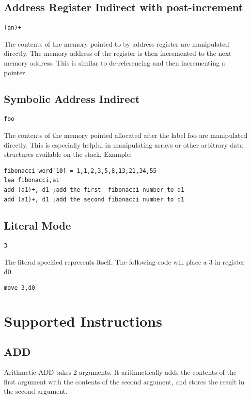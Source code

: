 \documentclass[10pt,fullpage]{article}
\begin{document}
\subsection*{Address Register Indirect with post-increment}
\begin{verbatim}(an)+\end{verbatim}
The contents of the memory pointed to by address register are
manipulated directly. The memory address of the register is then
incremented to the next memory address. This is similar to
de-referencing and then incrementing a pointer.

\subsection*{Symbolic Address Indirect}
\begin{verbatim}foo\end{verbatim}
The contents of the memory pointed allocated after the label foo are
manipulated directly. This is especially helpful in manipulating
arrays or other arbitrary data structures available on the stack.
Example:
\begin{verbatim}
fibonacci word[10] = 1,1,2,3,5,8,13,21,34,55
lea fibonacci,a1
add (a1)+, d1 ;add the first  fibonacci number to d1
add (a1)+, d1 ;add the second fibonacci number to d1
\end{verbatim}

\subsection*{Literal Mode}
\begin{verbatim}3\end{verbatim}
The literal specified represents itself. The following code will
place a 3 in register d0.
\begin{verbatim}move 3,d0\end{verbatim}


\section*{Supported Instructions}

\subsection*{ADD}
Arithmetic ADD takes 2 arguments. It arithmetically adds the
contents of the first argument with the contents of the second
argument, and stores the result in the second argument.
\end{document}
